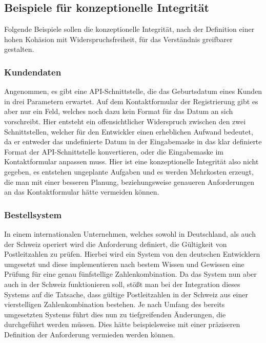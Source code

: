 \documentclass[a4paper, ngerman, 12pt, usenames, dvipsnames]{article}
\begin{document}
\subsection{Beispiele für konzeptionelle Integrität}
Folgende Beispiele sollen die konzeptionelle Integrität, nach der Definition einer hohen Kohäsion mit Widerspruchsfreiheit, für das Verständnis greifbarer gestalten.

\subsubsection{Kundendaten}
Angenommen, es gibt eine API-Schnittstelle, die das Geburtsdatum eines Kunden in drei Parametern erwartet. Auf dem Kontaktformular der Registrierung gibt es aber nur ein Feld, welches noch dazu kein Format für das Datum an sich vorschreibt. Hier entsteht ein offensichtlicher Widerspruch zwischen den zwei Schnittstellen, welcher für den Entwickler einen erheblichen Aufwand bedeutet, da er entweder das undefinierte Datum in der Eingabemaske in das klar definierte Format der API-Schnittstelle konvertieren, oder die Eingabemaske im Kontaktformular anpassen muss. Hier ist eine konzeptionelle Integrität also nicht gegeben, es entstehen ungeplante Aufgaben und es werden Mehrkosten erzeugt, die man mit einer besseren Planung, beziehungsweise genaueren Anforderungen an das Kontaktformular hätte vermeiden können.

\subsubsection{Bestellsystem}
In einem internationalen Unternehmen, welches sowohl in Deutschland, als auch der Schweiz operiert wird die Anforderung definiert, die Gültigkeit von Postleitzahlen zu prüfen. Hierbei wird ein System von den deutschen Entwicklern umgesetzt und diese implementieren nach bestem Wissen und Gewissen eine Prüfung für eine genau fünfstellige Zahlenkombination. Da das System nun aber auch in der Schweiz funktionieren soll, stößt man bei der Integration dieses Systems auf die Tatsache, dass gültige Postleitzahlen in der Schweiz aus einer vierstelligen Zahlenkombination bestehen. Je nach Umfang des bereits umgesetzten Systems führt dies nun zu tiefgreifenden Änderungen, die durchgeführt werden müssen. Dies hätte beispielsweise mit einer präziseren Definition der Anforderung vermieden werden können.
\end{document}
